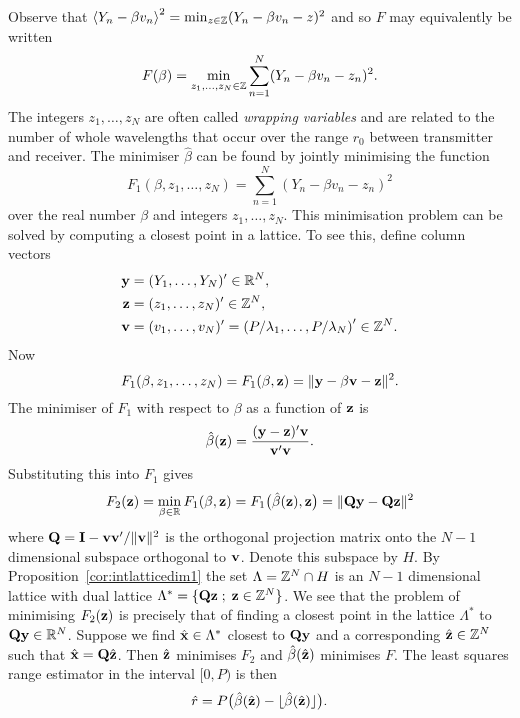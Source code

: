 \documentclass[10pt,twocolumn,twoside]{IEEEtran}
\begin{document}
Observe that $\left\langle Y_n - \beta v_n \right\rangle^2 = \min_{z \in {\mathbb Z}} (Y_n - \beta v_n - z)^2$ and so $F$ may equivalently be written
\[
F(\beta) = \min_{z_1,\dots,z_N \in {\mathbb Z}} \sum_{n=1}^N (Y_n - \beta v_n - z_n)^2.
\]
The integers $z_1,\dots,z_N$ are often called \emph{wrapping variables} and are related to the number of whole wavelengths that occur over the range $r_0$ between transmitter and receiver. The minimiser $\hat{\beta}$ can be found by jointly minimising the function
\[
F_1(\beta, z_1,\dots,z_N) = \sum_{n=1}^N (Y_n - \beta v_n - z_n)^2
\] 
over the real number $\beta$ and integers $z_1,\dots,z_N$.  This minimisation problem can be solved by computing a closest point in a lattice.  %
To see this, define column vectors 
\begin{align*}
\mathbf{y} &= (Y_1,\dots,Y_N)^\prime \in {\mathbb R}^N, \\
\mathbf{z} &= (z_1,\dots,z_N)^\prime \in {\mathbb Z}^N, \\
\mathbf{v} &= (v_1,\dots,v_N)^\prime = \left(P/\lambda_1,\dots,P/\lambda_N\right)^\prime \in {\mathbb Z}^N.
\end{align*}
Now
\[
F_1(\beta, z_1,\dots,z_N) = F_1(\beta, \mathbf{z}) =  \| \mathbf{y} - \beta\mathbf{v} - \mathbf{z} \|^2.
\]
The minimiser of $F_1$ with respect to $\beta$ as a function of $\mathbf{z}$ is
\[ 
\hat{\beta}(\mathbf{z}) = \frac{(\mathbf{y} - \mathbf{z})^\prime\mathbf{v}}{\mathbf{v}^\prime\mathbf{v}}.
\] 
Substituting this into $F_1$ gives
\[
F_2(\mathbf{z}) = \min_{\beta \in {\mathbb R}} F_1(\beta, \mathbf{z}) = F_1\big(\hat{\beta}(\mathbf{z}), \mathbf{z}\big) = \| \mathbf{Q}\mathbf{y} - \mathbf{Q}\mathbf{z} \|^2
\]
where $\mathbf{Q} = \mathbf{I} - \mathbf{v}\mathbf{v}^\prime/\|\mathbf{v}\|^2$ is the orthogonal projection matrix onto the $N-1$ dimensional subspace orthogonal to $\mathbf{v}$.  Denote this subspace by $H$.  By Proposition~\ref{cor:intlatticedim1} the set $\Lambda = {\mathbb Z}^N \cap H$ is an $N-1$ dimensional lattice with dual lattice $\Lambda^* = \{ \mathbf{Q} \mathbf{z} \; ; \; \mathbf{z} \in {\mathbb Z}^N \}$.  We see that the problem of minimising $F_2(\mathbf{z})$ is precisely that of finding a closest point in the lattice $\Lambda^*$ to $\mathbf{Q}\mathbf{y} \in {\mathbb R}^N$.  Suppose we find $\hat{\mathbf{x}} \in \Lambda^*$ closest to $\mathbf{Q} \mathbf{y}$ and a corresponding $\hat{\mathbf{z}} \in {\mathbb Z}^N$ such that $\hat{\mathbf{x}} = \mathbf{Q}\hat{\mathbf{z}}$.  Then $\hat{\mathbf{z}}$ minimises $F_2$ and $\hat{\beta}(\hat{\mathbf{z}})$ minimises $F$.  The least squares range estimator in the interval $[0,P)$ is then
\begin{equation}\label{eq:leastsquaresrangehatz}
\hat{r} = P\big(\hat{\beta}(\hat{\zbf}) - \sfloor{\hat{\beta}(\hat{\zbf})}\big). %
\end{equation}
\end{document}
